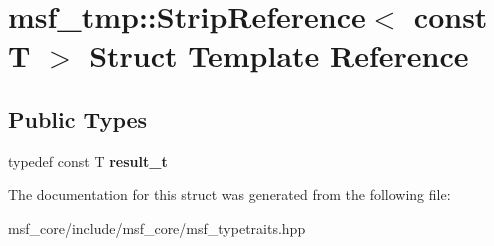 \hypertarget{structmsf__tmp_1_1StripReference_3_01const_01T_01_4}{\section{msf\-\_\-tmp\-:\-:Strip\-Reference$<$ const T $>$ Struct Template Reference}
\label{structmsf__tmp_1_1StripReference_3_01const_01T_01_4}
}
\subsection*{Public Types}
\begin{DoxyCompactItemize}
\item 
\hypertarget{structmsf__tmp_1_1StripReference_3_01const_01T_01_4_a4aa9040c1a950280fc8a134e0f7b6e4a}{typedef const T {\bfseries result\-\_\-t}}\label{structmsf__tmp_1_1StripReference_3_01const_01T_01_4_a4aa9040c1a950280fc8a134e0f7b6e4a}

\end{DoxyCompactItemize}


The documentation for this struct was generated from the following file\-:\begin{DoxyCompactItemize}
\item 
msf\-\_\-core/include/msf\-\_\-core/msf\-\_\-typetraits.\-hpp\end{DoxyCompactItemize}
